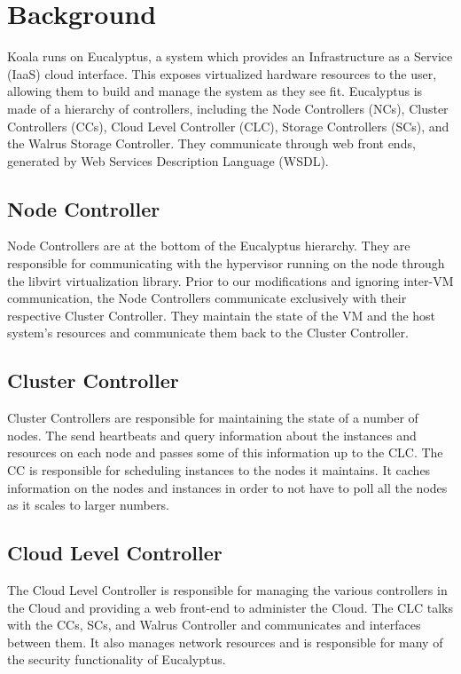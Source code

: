 \section{Background}

Koala runs on Eucalyptus, a system which provides an Infrastructure as a Service (IaaS) cloud interface.  This exposes virtualized hardware resources to the user, allowing them to build and manage the system as they see fit.  Eucalyptus is made of a hierarchy of controllers, including the Node Controllers (NCs), Cluster Controllers (CCs), Cloud Level Controller (CLC), Storage Controllers (SCs), and the Walrus Storage Controller.  They communicate through web front ends, generated by Web Services Description Language (WSDL).


\subsection{Node Controller}
Node Controllers are at the bottom of the Eucalyptus hierarchy.  They are responsible for communicating with the hypervisor running on the node through the libvirt virtualization library.  Prior to our modifications and ignoring inter-VM communication, the Node Controllers communicate exclusively with their respective Cluster Controller.  They maintain the state of the VM and the host system's resources and communicate them back to the Cluster Controller.

\subsection{Cluster Controller}
Cluster Controllers are responsible for maintaining the state of a number of nodes.  The send heartbeats and query information about the instances and resources on each node and passes some of this information up to the CLC.  The CC is responsible for scheduling instances to the nodes it maintains.  It caches information on the nodes and instances in order to not have to poll all the nodes as it scales to larger numbers.

\subsection{Cloud Level Controller}
The Cloud Level Controller is responsible for managing the various controllers in the Cloud and providing a web front-end to administer the Cloud.  The CLC talks with the CCs, SCs, and Walrus Controller and communicates and interfaces between them.  It also manages network resources and is responsible for many of the security functionality of Eucalyptus.

